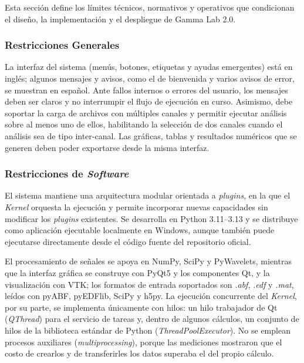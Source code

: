 \documentclass[12pt,letterpaper,oneside]{article}
\begin{document}
Esta sección define los límites técnicos, normativos y operativos que condicionan el diseño, la implementación y el despliegue de Gamma Lab 2.0.

\subsubsection{Restricciones Generales}

La interfaz del sistema (menús, botones, etiquetas y ayudas emergentes) está en inglés; algunos mensajes y avisos, como el de bienvenida y varios avisos de error, se muestran en español. Ante fallos internos o errores del usuario, los mensajes deben ser claros y no interrumpir el flujo de ejecución en curso. Asimismo, debe soportar la carga de archivos con múltiples canales y permitir ejecutar análisis sobre al menos uno de ellos, habilitando la selección de dos canales cuando el análisis sea de tipo inter-canal. Las gráficas, tablas y resultados numéricos que se generen deben poder exportarse desde la misma interfaz.

\subsubsection{Restricciones de \textit{Software}}

El sistema mantiene una arquitectura modular orientada a \textit{plugins}, en la que el \textit{Kernel} orquesta la ejecución y permite incorporar nuevas capacidades sin modificar los \textit{plugins} existentes. Se desarrolla en Python 3.11--3.13 y se distribuye como aplicación ejecutable localmente en Windows, aunque también puede ejecutarse directamente desde el código fuente del repositorio oficial.

El procesamiento de señales se apoya en NumPy, SciPy y PyWavelets, mientras que la interfaz gráfica se construye con PyQt5 y los componentes Qt, y la visualización con VTK; los formatos de entrada soportados son \textit{.abf}, \textit{.edf} y \textit{.mat}, leídos con pyABF, pyEDFlib, SciPy y h5py. La ejecución concurrente del \textit{Kernel}, por su parte, se implementa únicamente con hilos: un hilo trabajador de Qt (\textit{QThread}) para el servicio de tareas y, dentro de algunos cálculos, un conjunto de hilos de la biblioteca estándar de Python (\textit{ThreadPoolExecutor}). No se emplean procesos auxiliares (\textit{multiprocessing}), porque las mediciones mostraron que el costo de crearlos y de transferirles los datos superaba el del propio cálculo.
\end{document}
